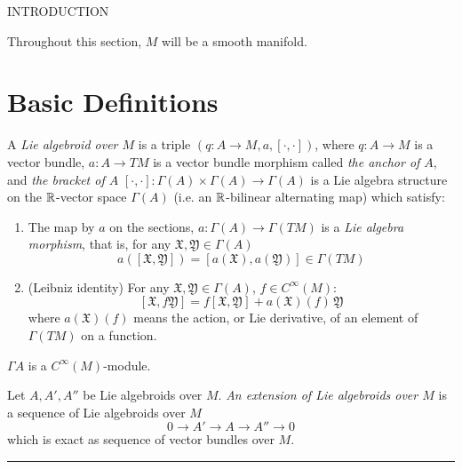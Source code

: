 INTRODUCTION


Throughout this section, $M$ will be a smooth manifold.

\section{Basic Definitions}

\begin{definition} 
A \emph{Lie algebroid over $M$} is a triple $(q:A \to M, a, [\cdot, \cdot ])$, where $q:A \to M$ is a vector bundle, $a:A \to TM$ is a vector bundle morphism called \emph{the anchor of $A$}, and \emph{the bracket of $A$} $[\cdot, \cdot ]: \Gamma(A) \times \Gamma(A) \to \Gamma(A)$ is a Lie algebra structure on the $\operatorname{\mathbb{R}}$-vector space $\Gamma(A)$ (i.e. an $\operatorname{\mathbb{R}}$-bilinear alternating map) which satisfy:

\begin{enumerate}
    \item The map by $a$ on the sections, $a:\Gamma(A) \to \Gamma(TM)$ is a \emph{Lie algebra morphism}, that is, for any $\mathfrak X, \mathfrak Y \in \Gamma(A)$ \[ a([\mathfrak X, \mathfrak Y])  = [a(\mathfrak X), a(\mathfrak Y)] \in  \Gamma(TM)\]
    
    \item (Leibniz identity) For any $\mathfrak X, \mathfrak Y \in \Gamma(A)$, $f \in C^\infty (M)$: \[ [\mathfrak X, f\mathfrak Y] = f[\mathfrak X, \mathfrak Y] + a(\mathfrak X)(f)\, \mathfrak Y \] where $a(\mathfrak X)(f)$ means the action, or Lie derivative, of an element of $\Gamma(TM)$ on a function.
\end{enumerate}
\end{definition}

$\Gamma A$ is a $C^\infty(M)$-module.

\begin{definition} 

\end{definition}

\begin{definition} 
Let $A, A', A''$ be Lie algebroids over $M$. \emph{An extension of Lie algebroids over $M$} is a sequence of Lie algebroids over $M$ \[ 0 \to A' \to A \to A'' \to 0 \] which is exact as sequence of vector bundles over $M$. 
\end{definition}
\rule{10cm}{1mm}

